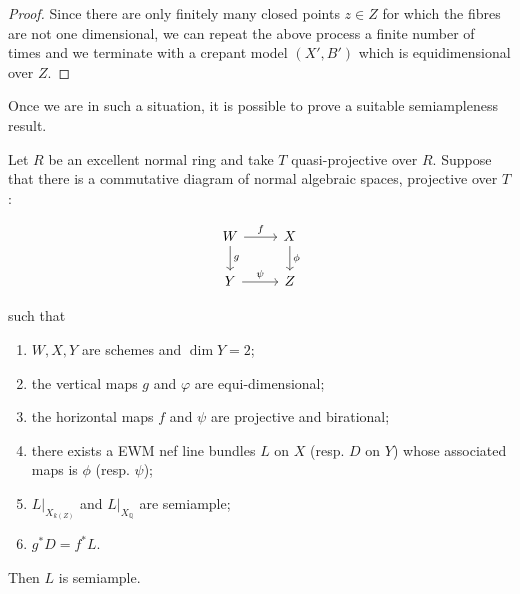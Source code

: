 \documentclass[a4paper,12pt]{book}
\begin{document}
\begin{proof}
		Since there are only finitely many closed points $z \in Z$ for which the fibres are not one dimensional, we can repeat the above process a finite number of times and we terminate with a crepant model $(X',B')$ which is equidimensional over $Z$.	
	\end{proof}
	
	Once we are in such a situation, it is possible to prove a suitable semiampleness result.
	
	\begin{proposition}\label{EDsemiampleness2}
		Let $R$ be an excellent normal ring and take $T$ quasi-projective over $R$. Suppose that there is a commutative diagram of normal algebraic spaces, projective over $T$:
		
		\[\begin{tikzcd}
		W \arrow[d, "g"] \arrow[r, "f"] & X \arrow[d, "\phi"] \\
		Y \arrow[r, "\psi"]             & Z                  
		\end{tikzcd}\]
		
		such that
		
		\begin{enumerate}
			\item $W,X,Y$ are schemes and $\dim Y =2$;
			\item the vertical maps $g$ and $\varphi$ are equi-dimensional;
			\item the horizontal maps $f$ and $\psi$ are projective and birational;
			\item there exists a EWM nef line bundles $L$ on $X$ (resp.  $D$ on $Y$) whose associated maps is $\phi$ (resp. $\psi$);
			\item $L|_{X_{k(Z)}}$ and $L|_{X_\mathbb{Q}}$ are semiample;
			\item $g^{*}D=f^{*}L$.
		\end{enumerate}
		
		Then $L$ is semiample.
	\end{proposition}
	
\end{document}

